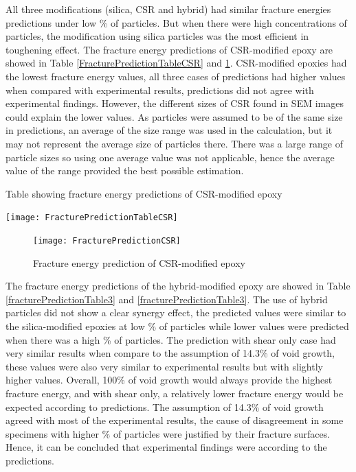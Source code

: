 \documentclass[numbers=noendperiod,chapterprefix=on]{icldt} %
\begin{document}
All three modifications (silica, CSR and hybrid) had similar fracture energies predictions under low \% of particles. But when there were high concentrations of particles, the modification using silica particles was the most efficient in toughening effect. 
The fracture energy predictions of CSR-modified epoxy are showed in Table \ref{FracturePredictionTableCSR} and \ref{FracturePredictionCSR}. CSR-modified epoxies had the lowest fracture energy values, all three cases of predictions had higher values when compared with experimental results, predictions did not agree with experimental findings. However, the different sizes of CSR found in SEM images could explain the lower values. As particles were assumed to be of the same size in predictions, an average of the size range was used in the calculation, but it may not represent the average size of particles there. There was a large range of particle sizes so using one average value was not applicable, hence the average value of the range provided the best possible estimation.

\begin{table}[!htpb]
\centering
\caption{Table showing fracture energy predictions of CSR-modified epoxy} \label{FracturePredictionTableCSR}
\texttt{[image: FracturePredictionTableCSR]}
\end{table}
\FloatBarrier

\begin{figure}[!htpb]
\centering
\texttt{[image: FracturePredictionCSR]}
\caption{Fracture energy prediction of CSR-modified epoxy} \label{FracturePredictionCSR}
\end{figure}
\FloatBarrier

The fracture energy predictions of the hybrid-modified epoxy are showed in Table \ref{fracturePredictionTable3} and \ref{fracturePredictionTable3}. The use of hybrid particles did not show a clear synergy effect, the predicted values were similar to the silica-modified epoxies at low \% of particles while lower values were predicted when there was a high \% of particles. The prediction with shear only case had very similar results when compare to the assumption of 14.3\% of void growth, these values were also very similar to experimental results but with slightly higher values.
Overall, 100\% of void growth would always provide the highest fracture energy, and with shear only, a relatively lower fracture energy would be expected according to predictions. The assumption of 14.3\% of void growth agreed with most of the experimental results, the cause of disagreement in some specimens with higher \% of particles were justified by their fracture surfaces. Hence, it can be concluded that experimental findings were according to the predictions. 
\end{document}
